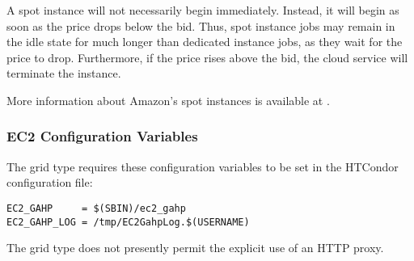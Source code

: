 A spot instance will not necessarily begin immediately.
Instead, 
it will begin as soon as the price drops below the bid.
Thus, spot instance jobs
may remain in the idle state for much longer than dedicated instance jobs,
as they wait for the price to drop.
Furthermore, if the price rises above the bid, 
the cloud service will terminate the instance.

More information about Amazon's spot instances is available at
.


\subsubsection{\label{sec:Amazon-config}EC2 Configuration Variables}

The  grid type requires these configuration variables 
to be set in the HTCondor configuration file:

\footnotesize
\begin{verbatim}
EC2_GAHP     = $(SBIN)/ec2_gahp
EC2_GAHP_LOG = /tmp/EC2GahpLog.$(USERNAME)
\end{verbatim}
\normalsize

The  grid type does not presently permit the explicit use 
of an HTTP proxy.
